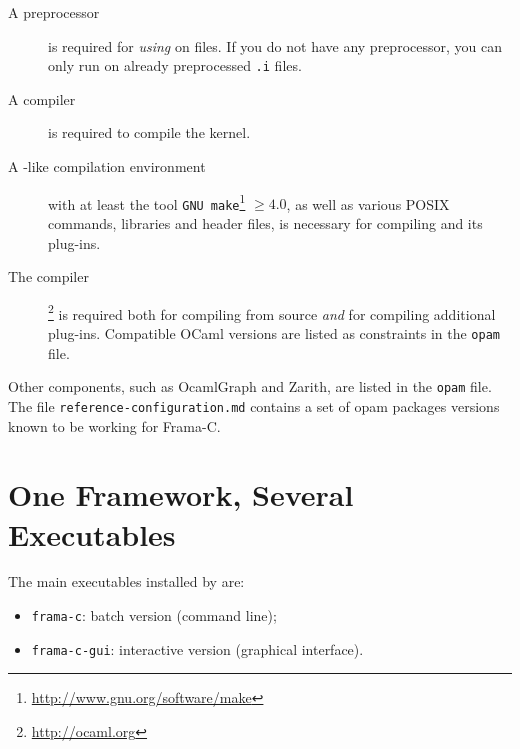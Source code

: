 \begin{description}
\item[A \C preprocessor] is required for \emph{using}
  \FramaC on \C files. If you do not have any \C preprocessor,
  you can only run \FramaC on already preprocessed \texttt{.i} files.
\item[A \C compiler] is required to compile the \FramaC
  kernel.
\item[A -like compilation environment] with at least the tool
  \texttt{GNU make}\footnote{\url{http://www.gnu.org/software/make}} $\ge 4.0$,
  as well as various POSIX commands, libraries and header files, is necessary
  for compiling \FramaC and its plug-ins.
\item[The \caml compiler]\footnote{\url{http://ocaml.org}}
  is required both for compiling \FramaC from source \emph{and} for compiling
  additional plug-ins. Compatible OCaml versions are listed as constraints in
  the \texttt{opam} file.
\end{description}

Other components, such as OcamlGraph and Zarith, are listed in the
\texttt{opam} file. The file \texttt{reference-configuration.md} contains a set
of opam packages versions known to be working for Frama-C.

\section{One Framework, Several Executables}\label{sec:modes}

The main executables installed by \FramaC are:

\begin{itemize}
\item \texttt{frama-c}: batch version (command line);
\item \texttt{frama-c-gui}: interactive version (graphical interface).
\end{itemize}

